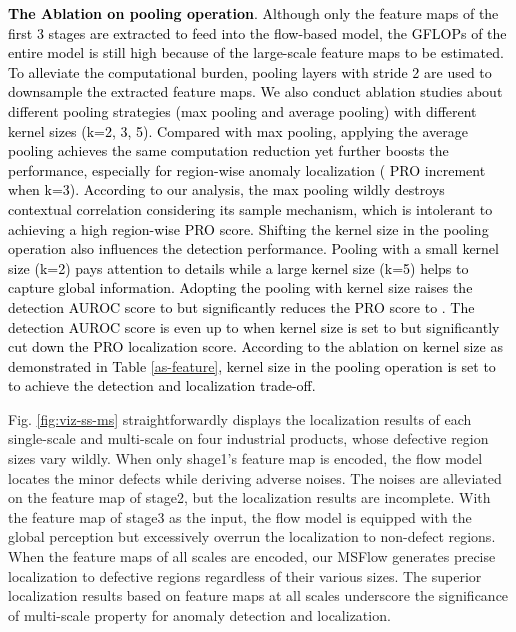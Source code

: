 \documentclass[lettersize,journal]{IEEEtran}
\newcommand{\rounda}[1]{\textcolor{black}{#1}}
\begin{document}
\rounda{
  \textbf{The Ablation on pooling operation}.
  Although only the feature maps of the first 3 stages are extracted to feed into the flow-based model, the GFLOPs of the entire model is still high because of the large-scale feature maps to be estimated. 
	To alleviate the computational burden, pooling layers with stride 2 are used to  downsample the extracted feature maps. We also conduct ablation studies about different pooling strategies (max pooling and average pooling) with different kernel sizes (k=2, 3, 5).
	Compared with max pooling, applying the average pooling achieves the same computation reduction yet further boosts the performance, especially for region-wise anomaly localization ( PRO increment when k=3).
	According to our analysis, the max pooling wildly destroys contextual correlation considering its sample mechanism, which is intolerant to achieving a high region-wise PRO score.
	Shifting the kernel size in the pooling operation also influences the detection performance. Pooling with a small kernel size (k=2) pays attention to details while a large kernel size (k=5) helps to capture global information. 
	Adopting the pooling with kernel size  raises the detection AUROC score to  but significantly reduces the PRO score to .
	The detection AUROC score is even up to  when kernel size is set to  but significantly cut down the PRO localization score. According to the ablation on kernel size as demonstrated in Table \ref{as-feature}, kernel size in the pooling operation is set to  to achieve the detection and localization trade-off.
}



Fig. \ref{fig:viz-ss-ms} straightforwardly displays the localization results of each single-scale and multi-scale on four industrial products, whose defective region sizes vary wildly. When only shage1's feature map is encoded, the flow model locates the minor defects while deriving adverse noises. The noises are alleviated on the feature map of stage2, but the localization results are incomplete. With the feature map of stage3 as the input, the flow model is equipped with the global perception but excessively overrun the localization to non-defect regions. When the feature maps of all scales are encoded, our MSFlow generates precise localization to defective regions regardless of their various sizes. The superior localization results based on feature maps at all scales underscore the significance of multi-scale property for anomaly detection and localization.
\end{document}
